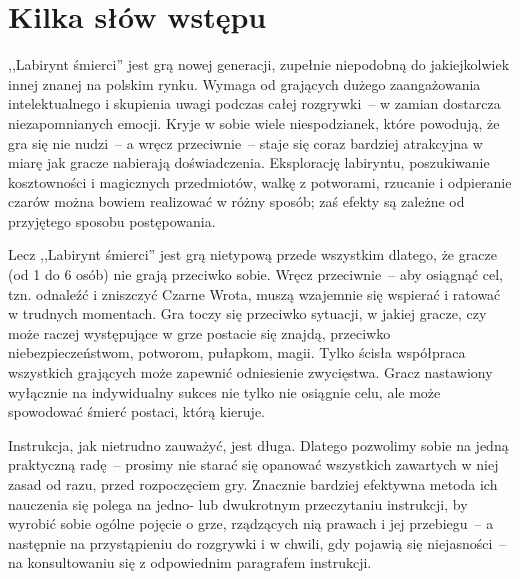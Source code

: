 \section{Kilka słów wstępu}

,,Labirynt śmierci'' jest grą nowej generacji, zupełnie niepodobną do jakiejkolwiek innej znanej na polskim rynku.
Wymaga od grających dużego zaangażowania intelektualnego i skupienia uwagi podczas całej rozgrywki~-- w zamian dostarcza niezapomnianych emocji.
Kryje w sobie wiele niespodzianek, które powodują, że gra się nie nudzi~-- a wręcz przeciwnie~-- staje się coraz bardziej atrakcyjna w miarę jak gracze nabierają doświadczenia.
Eksplorację labiryntu, poszukiwanie kosztowności i magicznych przedmiotów, walkę z potworami, rzucanie i odpieranie czarów można bowiem realizować w różny sposób; zaś efekty są zależne od przyjętego sposobu postępowania.

Lecz ,,Labirynt śmierci'' jest grą nietypową przede wszystkim dlatego, że gracze (od 1 do 6 osób) nie grają przeciwko sobie.
Wręcz przeciwnie~-- aby osiągnąć cel, tzn. odnaleźć i zniszczyć Czarne Wrota, muszą wzajemnie się wspierać i ratować w trudnych momentach.
Gra toczy się przeciwko sytuacji, w jakiej gracze, czy może raczej występujące w grze postacie się znajdą, przeciwko niebezpieczeństwom, potworom, pułapkom, magii.
Tylko ścisła współpraca wszystkich grających może zapewnić odniesienie zwycięstwa.
Gracz nastawiony wyłącznie na indywidualny sukces nie tylko nie osiągnie celu, ale może spowodować śmierć postaci, którą kieruje.

Instrukcja, jak nietrudno zauważyć, jest długa.
Dlatego pozwolimy sobie na jedną praktyczną radę~-- prosimy nie starać się opanować wszystkich zawartych w niej zasad od razu, przed rozpoczęciem gry.
Znacznie bardziej efektywna metoda ich nauczenia się polega na jedno- lub dwukrotnym przeczytaniu instrukcji, by wyrobić sobie ogólne pojęcie o grze, rządzących nią prawach i jej przebiegu~-- a następnie na przystąpieniu do rozgrywki i w chwili, gdy pojawią się niejasności~-- na konsultowaniu się z odpowiednim paragrafem instrukcji.
